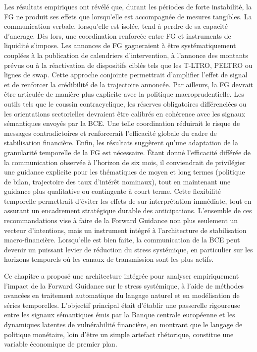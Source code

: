 Les résultats empiriques ont révélé que, durant les périodes de forte instabilité, la FG ne produit ses effets que lorsqu’elle est accompagnée de mesures tangibles. La communication verbale, lorsqu’elle est isolée, tend à perdre de sa capacité d’ancrage. Dès lors, une coordination renforcée entre FG et instruments de liquidité s’impose. Les annonces de FG gagneraient à être systématiquement couplées à la publication de calendriers d’intervention, à l’annonce des montants prévus ou à la réactivation de dispositifs ciblés tels que les T-LTRO, PELTRO ou lignes de swap. Cette approche conjointe permettrait d’amplifier l’effet de signal et de renforcer la crédibilité de la trajectoire annoncée. Par ailleurs, la FG devrait être articulée de manière plus explicite avec la politique macroprudentielle. Les outils tels que le coussin contracyclique, les réserves obligatoires différenciées ou les orientations sectorielles devraient être calibrés en cohérence avec les signaux sémantiques envoyés par la BCE. Une telle coordination réduirait le risque de messages contradictoires et renforcerait l’efficacité globale du cadre de stabilisation financière. Enfin, les résultats suggèrent qu’une adaptation de la granularité temporelle de la FG est nécessaire. Étant donné l’efficacité différée de la communication observée à l’horizon de six mois, il conviendrait de privilégier une guidance explicite pour les thématiques de moyen et long termes (politique de bilan, trajectoire des taux d’intérêt nominaux), tout en maintenant une guidance plus qualitative ou contingente à court terme. Cette flexibilité temporelle permettrait d’éviter les effets de sur-interprétation immédiate, tout en assurant un encadrement stratégique durable des anticipations. L’ensemble de ces recommandations vise à faire de la Forward Guidance non plus seulement un vecteur d’intentions, mais un instrument intégré à l’architecture de stabilisation macro-financière. Lorsqu’elle est bien faite, la communication de la BCE peut devenir un puissant levier de réduction du stress systémique, en particulier sur les horizons temporels où les canaux de transmission sont les plus actifs.

\newpage

Ce chapitre a proposé une architecture intégrée pour analyser empiriquement l’impact de la Forward Guidance sur le stress systémique, à l’aide de méthodes avancées en traitement automatique du langage naturel et en modélisation de séries temporelles. L’objectif principal était d’établir une passerelle rigoureuse entre les signaux sémantiques émis par la Banque centrale européenne et les dynamiques latentes de vulnérabilité financière, en montrant que le langage de politique monétaire, loin d’être un simple artefact rhétorique, constitue une variable économique de premier plan.\\

